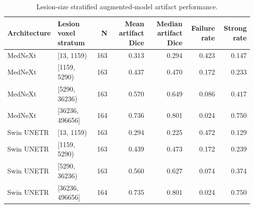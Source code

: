 \begin{table}
\caption{Lesion-size stratified augmented-model artifact performance.}
\label{tab:lesion_augmented}
\begin{tabular}{llrrrrr}
\toprule
Architecture & Lesion voxel stratum & N & Mean artifact Dice & Median artifact Dice & Failure rate & Strong rate \\
\midrule
MedNeXt & [13, 1159) & 163 & 0.313 & 0.294 & 0.423 & 0.147 \\
MedNeXt & [1159, 5290) & 163 & 0.437 & 0.470 & 0.172 & 0.233 \\
MedNeXt & [5290, 36236) & 163 & 0.570 & 0.649 & 0.086 & 0.417 \\
MedNeXt & [36236, 496656] & 164 & 0.736 & 0.801 & 0.024 & 0.750 \\
Swin UNETR & [13, 1159) & 163 & 0.294 & 0.225 & 0.472 & 0.129 \\
Swin UNETR & [1159, 5290) & 163 & 0.439 & 0.473 & 0.172 & 0.239 \\
Swin UNETR & [5290, 36236) & 163 & 0.560 & 0.627 & 0.074 & 0.374 \\
Swin UNETR & [36236, 496656] & 164 & 0.735 & 0.801 & 0.024 & 0.750 \\
\bottomrule
\end{tabular}
\end{table}
